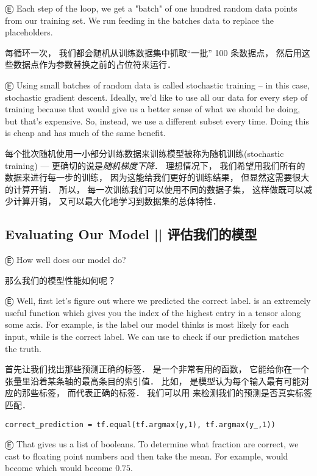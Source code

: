 Ⓔ Each step of the loop, we get a "batch" of one hundred random data points from our training set. We run  feeding in the batches data to replace the placeholders.

每循环一次， 我们都会随机从训练数据集中抓取``一批'' 100 条数据点， 然后用这些数据点作为参数替换之前的占位符来运行．

Ⓔ Using small batches of random data is called stochastic training -- in this case, stochastic gradient descent. Ideally, we'd like to use all our data for every step of training because that would give us a better sense of what we should be doing, but that's expensive. So, instead, we use a different subset every time. Doing this is cheap and has much of the same benefit.

每个批次随机使用一小部分训练数据来训练模型被称为随机训练(stochastic training) --- 更确切的说是{\em 随机梯度下降}．  理想情况下， 我们希望用我们所有的数据来进行每一步的训练， 因为这能给我们更好的训练结果， 但显然这需要很大的计算开销．  所以， 每一次训练我们可以使用不同的数据子集， 这样做既可以减少计算开销， 又可以最大化地学习到数据集的总体特性．

\subsection{Evaluating Our Model   ||   评估我们的模型}

Ⓔ How well does our model do?

那么我们的模型性能如何呢？

Ⓔ Well, first let's figure out where we predicted the correct label.  is an extremely useful function which gives you the index of the highest entry in a tensor along some axis. For example,  is the label our model thinks is most likely for each input, while  is the correct label. We can use  to check if our prediction matches the truth.

首先让我们找出那些预测正确的标签．  是一个非常有用的函数， 它能给你在一个张量里沿着某条轴的最高条目的索引值．  比如， 是模型认为每个输入最有可能对应的那些标签， 而代表正确的标签．  我们可以用 来检测我们的预测是否真实标签匹配．

\begin{lstlisting}
correct_prediction = tf.equal(tf.argmax(y,1), tf.argmax(y_,1))
\end{lstlisting}

Ⓔ That gives us a list of booleans. To determine what fraction are correct, we cast to floating point numbers and then take the mean. For example,  would become \li{[1,0,1,1]} which would become $0.75$.

